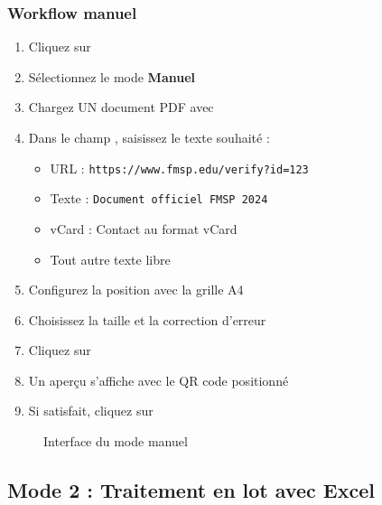 \subsubsection{Workflow manuel}

\begin{enumerate}[leftmargin=*]
    \item Cliquez sur 
    \item Sélectionnez le mode \textbf{Manuel}
    \item Chargez UN document PDF avec 
    \item Dans le champ , saisissez le texte souhaité :
    \begin{itemize}
        \item URL : \texttt{https://www.fmsp.edu/verify?id=123}
        \item Texte : \texttt{Document officiel FMSP 2024}
        \item vCard : Contact au format vCard
        \item Tout autre texte libre
    \end{itemize}
    \item Configurez la position avec la grille A4
    \item Choisissez la taille et la correction d'erreur
    \item Cliquez sur 
    \item Un aperçu s'affiche avec le QR code positionné
    \item Si satisfait, cliquez sur 
\end{enumerate}

\begin{figure}[h]
    \centering
    \caption{Interface du mode manuel}
\end{figure}

\subsection{Mode 2 : Traitement en lot avec Excel}

